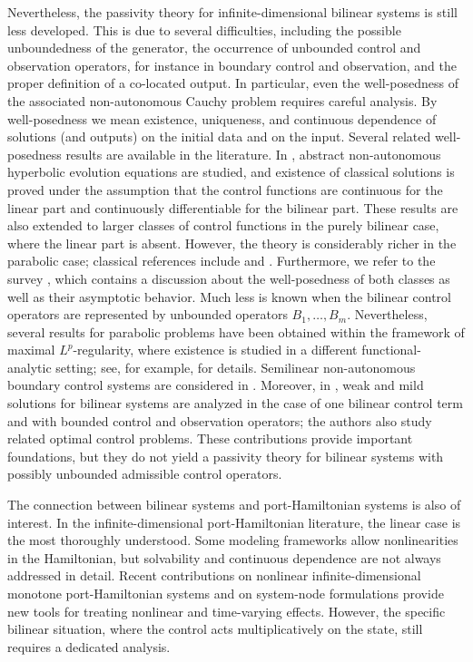 \documentclass{cocv}
\theoremstyle{definition}
\begin{document}
Nevertheless, the passivity theory for infinite-dimensional bilinear systems is still less developed. This is due to several difficulties, including the possible unboundedness of the generator, the occurrence of unbounded control and observation operators, for instance in boundary control and observation, and the proper definition of a co-located output. In particular, even the well-posedness of the associated non-autonomous Cauchy problem requires careful analysis. By well-posedness we mean existence, uniqueness, and continuous dependence of solutions (and outputs) on the initial data and on the input. Several related well-posedness results are available in the literature. In \cite{Kato70}, abstract non-autonomous hyperbolic evolution equations are studied, and existence of classical solutions is proved under the assumption that the control functions are continuous for the linear part and continuously differentiable for the bilinear part. These results are also extended to larger classes of control functions in the purely bilinear case, where the linear part is absent. However, the theory is considerably richer in the parabolic case; classical references include \cite{Amann95} and \cite{lunardi1995analytic}. Furthermore, we refer to the survey \cite{Schnaubelt2002}, which contains a discussion about the well-posedness of both classes as well as their asymptotic behavior. Much less is known when the bilinear control operators are represented by unbounded operators $B_{1},\dots,B_{m}$. Nevertheless, several results for parabolic problems have been obtained within the framework of maximal $L^{p}$-regularity, where existence is studied in a different functional-analytic setting; see, for example, \cite{Arendt07} for details. Semilinear non-autonomous boundary control systems are considered in \cite{SchmDJL19}. Moreover, in \cite{AroBonKro2018}, weak and mild solutions for bilinear systems are analyzed in the case of one bilinear control term and with bounded control and observation operators; the authors also study related optimal control problems. These contributions provide important foundations, but they do not yield a passivity theory for bilinear systems with possibly unbounded admissible control operators.

The connection between bilinear systems and port-Hamiltonian systems is also of interest. In the infinite-dimensional port-Hamiltonian literature, the linear case is the most thoroughly understood. Some modeling frameworks allow nonlinearities in the Hamiltonian, but solvability and continuous dependence are not always addressed in detail. Recent contributions on nonlinear infinite-dimensional monotone port-Hamiltonian systems \cite{GernScha25} and on system-node formulations \cite{Philipp2025} provide new tools for treating nonlinear and time-varying effects. However, the specific bilinear situation, where the control acts multiplicatively on the state, still requires a dedicated analysis.
\end{document}
